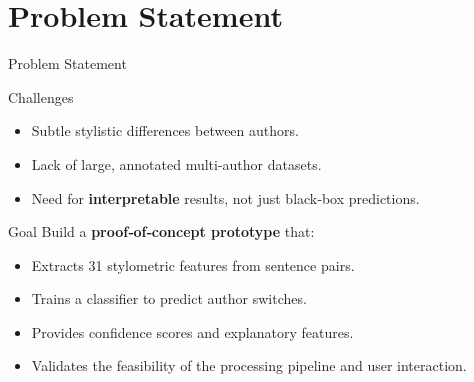 \documentclass[compress,aspectratio=169]{beamer}
\begin{document}
\section{Problem Statement}
\begin{frame}{Problem Statement}
    \begin{block}{Challenges}
        \begin{itemize}
            \item Subtle stylistic differences between authors.
            \item Lack of large, annotated multi-author datasets.
            \item Need for \textbf{interpretable} results, not just black‑box predictions.
        \end{itemize}
    \end{block}
    \pause
    \begin{block}{Goal}
        Build a \textbf{proof‑of‑concept prototype} that:
        \begin{itemize}
            \item Extracts 31 stylometric features from sentence pairs.
            \item Trains a classifier to predict author switches.
            \item Provides confidence scores and explanatory features.
            \item Validates the feasibility of the processing pipeline and user interaction.
        \end{itemize}
    \end{block}
\end{frame}

\end{document}
